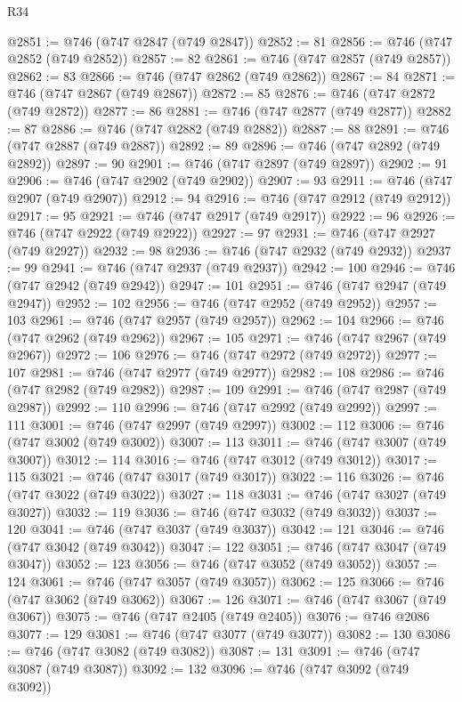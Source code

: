 \begin{lexlean}{R34}
\begin{coremodule}
@2851 := @746 (@747 @2847 (@749 @2847))
@2852 := 81
@2856 := @746 (@747 @2852 (@749 @2852))
@2857 := 82
@2861 := @746 (@747 @2857 (@749 @2857))
@2862 := 83
@2866 := @746 (@747 @2862 (@749 @2862))
@2867 := 84
@2871 := @746 (@747 @2867 (@749 @2867))
@2872 := 85
@2876 := @746 (@747 @2872 (@749 @2872))
@2877 := 86
@2881 := @746 (@747 @2877 (@749 @2877))
@2882 := 87
@2886 := @746 (@747 @2882 (@749 @2882))
@2887 := 88
@2891 := @746 (@747 @2887 (@749 @2887))
@2892 := 89
@2896 := @746 (@747 @2892 (@749 @2892))
@2897 := 90
@2901 := @746 (@747 @2897 (@749 @2897))
@2902 := 91
@2906 := @746 (@747 @2902 (@749 @2902))
@2907 := 93
@2911 := @746 (@747 @2907 (@749 @2907))
@2912 := 94
@2916 := @746 (@747 @2912 (@749 @2912))
@2917 := 95
@2921 := @746 (@747 @2917 (@749 @2917))
@2922 := 96
@2926 := @746 (@747 @2922 (@749 @2922))
@2927 := 97
@2931 := @746 (@747 @2927 (@749 @2927))
@2932 := 98
@2936 := @746 (@747 @2932 (@749 @2932))
@2937 := 99
@2941 := @746 (@747 @2937 (@749 @2937))
@2942 := 100
@2946 := @746 (@747 @2942 (@749 @2942))
@2947 := 101
@2951 := @746 (@747 @2947 (@749 @2947))
@2952 := 102
@2956 := @746 (@747 @2952 (@749 @2952))
@2957 := 103
@2961 := @746 (@747 @2957 (@749 @2957))
@2962 := 104
@2966 := @746 (@747 @2962 (@749 @2962))
@2967 := 105
@2971 := @746 (@747 @2967 (@749 @2967))
@2972 := 106
@2976 := @746 (@747 @2972 (@749 @2972))
@2977 := 107
@2981 := @746 (@747 @2977 (@749 @2977))
@2982 := 108
@2986 := @746 (@747 @2982 (@749 @2982))
@2987 := 109
@2991 := @746 (@747 @2987 (@749 @2987))
@2992 := 110
@2996 := @746 (@747 @2992 (@749 @2992))
@2997 := 111
@3001 := @746 (@747 @2997 (@749 @2997))
@3002 := 112
@3006 := @746 (@747 @3002 (@749 @3002))
@3007 := 113
@3011 := @746 (@747 @3007 (@749 @3007))
@3012 := 114
@3016 := @746 (@747 @3012 (@749 @3012))
@3017 := 115
@3021 := @746 (@747 @3017 (@749 @3017))
@3022 := 116
@3026 := @746 (@747 @3022 (@749 @3022))
@3027 := 118
@3031 := @746 (@747 @3027 (@749 @3027))
@3032 := 119
@3036 := @746 (@747 @3032 (@749 @3032))
@3037 := 120
@3041 := @746 (@747 @3037 (@749 @3037))
@3042 := 121
@3046 := @746 (@747 @3042 (@749 @3042))
@3047 := 122
@3051 := @746 (@747 @3047 (@749 @3047))
@3052 := 123
@3056 := @746 (@747 @3052 (@749 @3052))
@3057 := 124
@3061 := @746 (@747 @3057 (@749 @3057))
@3062 := 125
@3066 := @746 (@747 @3062 (@749 @3062))
@3067 := 126
@3071 := @746 (@747 @3067 (@749 @3067))
@3075 := @746 (@747 @2405 (@749 @2405))
@3076 := @746 @2086
@3077 := 129
@3081 := @746 (@747 @3077 (@749 @3077))
@3082 := 130
@3086 := @746 (@747 @3082 (@749 @3082))
@3087 := 131
@3091 := @746 (@747 @3087 (@749 @3087))
@3092 := 132
@3096 := @746 (@747 @3092 (@749 @3092))

\end{coremodule}
\end{lexlean}
